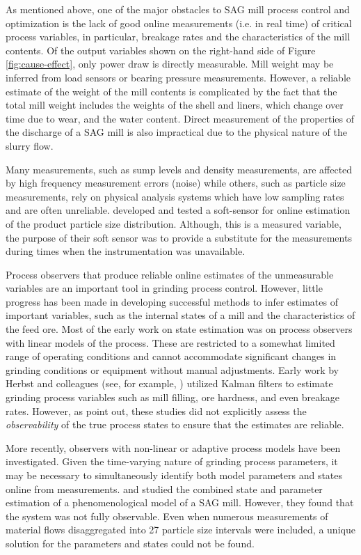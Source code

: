 As mentioned above, one of the major obstacles to \acrshort{SAG} mill process control and optimization is the lack of good online measurements (i.e. in real time) of critical process variables, in particular, breakage rates and the characteristics of the mill contents. Of the output variables shown on the right-hand side of Figure \ref{fig:cause-effect}, only power draw is directly measurable. Mill weight may be inferred from load sensors or bearing pressure measurements. However, a reliable estimate of the weight of the mill contents is complicated by the fact that the total mill weight includes the weights of the shell and liners, which change over time due to wear, and the water content. Direct measurement of the properties of the discharge of a \acrshort{SAG} mill is also impractical due to the physical nature of the slurry flow.

Many measurements, such as sump levels and density measurements, are affected by high frequency measurement errors (noise) while others, such as particle size measurements, rely on physical analysis systems which have low sampling rates and are often unreliable. \cite{casali_particle_1998} developed and tested a soft-sensor for online estimation of the product particle size distribution. Although, this is a measured variable, the purpose of their soft sensor was to provide a substitute for the measurements during times when the instrumentation was unavailable.

Process observers that produce reliable online estimates of the unmeasurable variables are an important tool in grinding process control. However, little progress has been made in developing successful methods to infer estimates of important variables, such as the internal states of a mill and the characteristics of the feed ore. Most of the early work on state estimation was on process observers with linear models of the process. These are restricted to a somewhat limited range of operating conditions and cannot accommodate significant changes in grinding conditions or equipment without manual adjustments. Early work by Herbst and colleagues (see, for example, \cite{herbst_model-based_1992}) utilized Kalman filters to estimate grinding process variables such as mill filling, ore hardness, and even breakage rates. However, as \cite{le_roux_ekf_2017} point out, these studies did not explicitly assess the \textit{observability} of the true process states to ensure that the estimates are reliable.

More recently, observers with non-linear or adaptive process models have been investigated. Given the time-varying nature of grinding process parameters, it may be necessary to simultaneously identify both model parameters and states online from measurements. \cite{apelt_inferential_2002} and \cite{apelt_inferential_2002-1} studied the combined state and parameter estimation of a phenomenological model of a \acrshort{SAG} mill. However, they found that the system was not fully observable. Even when numerous measurements of material flows disaggregated into 27 particle size intervals were included, a unique solution for the parameters and states could not be found.

